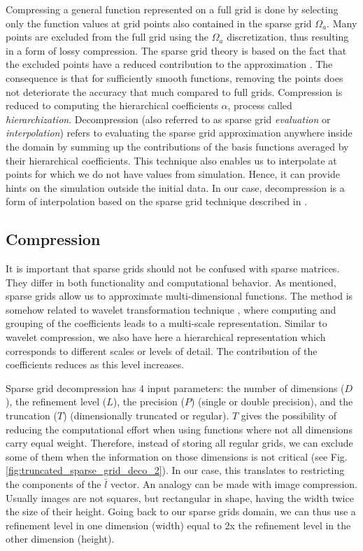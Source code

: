 Compressing a general function represented on a full grid is done by selecting
only the function values at grid points also contained in the sparse grid $\Omega_a$. 
Many points are excluded from the full grid using the $\Omega_a$ discretization, thus resulting
in a form of lossy compression. 
The sparse grid theory is based on the fact that the excluded points have a reduced 
contribution to the approximation \cite{CambridgeJournals:227245}. The consequence is
that for sufficiently smooth functions, removing the points does not deteriorate the
accuracy that much compared to full grids. 
Compression is reduced to computing the hierarchical coefficients $\alpha$, process called
\textit{hierarchization}. Decompression (also referred to as sparse grid \textit{evaluation} or \textit{interpolation}) refers to
evaluating the sparse grid approximation anywhere inside the domain by summing up the
contributions of the basis functions averaged by their hierarchical
coefficients. This technique also enables us to interpolate at points for which
we do not have values from simulation. Hence, it can provide hints on the
simulation outside the initial data. In our case, decompression is a form of
interpolation based on the sparse grid technique described in
\cite{CambridgeJournals:227245}.

\subsection{Compression}

It is important that sparse grids should not be confused with sparse matrices.
They differ in both functionality and computational behavior. As mentioned,
sparse grids allow us to approximate multi-dimensional functions. The method is
somehow related to wavelet transformation technique \cite{Mallat89atheory},
where computing and grouping of the coefficients leads to a multi-scale representation. 
Similar to wavelet compression, we also have here a hierarchical representation which corresponds
to different scales or levels of detail. The contribution of the coefficients reduces as
this level increases.

Sparse grid decompression has 4 input parameters: the number of dimensions
($D$), the refinement level ($L$), the
precision ($P$) (single or double precision), and the truncation ($T$)
(dimensionally truncated or regular). $T$ gives the possibility of reducing the
computational effort when using functions where not all dimensions carry
equal weight. Therefore, instead of storing all regular grids, we can exclude
some of them when the information on those dimensions is not critical (see Fig.
\ref{fig:truncated_sparse_grid_deco_2}). In our case, this translates to
restricting the components of the $\bar{l}$ vector. An analogy can be made with
image compression. Usually images are not squares, but rectangular in shape,
having the width twice the size of their height. Going back to our sparse grids
domain, we can thus use a refinement level in one dimension (width) equal to 2x
the refinement level in the other dimension (height).

